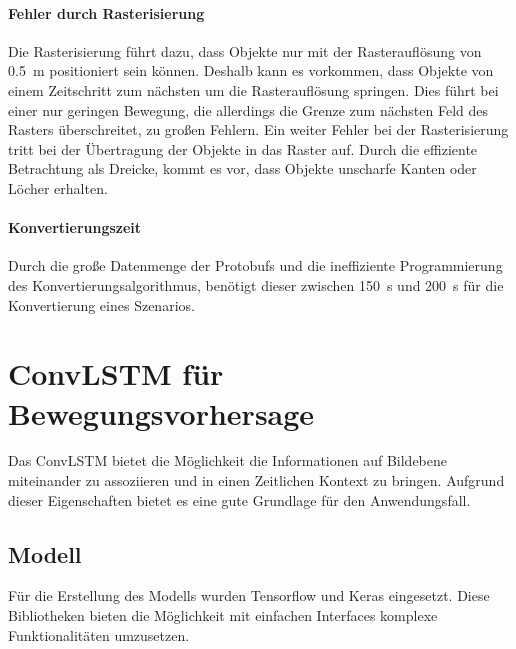 \documentclass[12pt]{article}
\begin{document}
        \paragraph{Fehler durch Rasterisierung} Die Rasterisierung führt dazu, dass Objekte nur mit der Rasterauflösung von 0.5~m positioniert sein können. 
        Deshalb kann es vorkommen, dass Objekte von einem Zeitschritt zum nächsten um die Rasterauflösung springen. 
        Dies führt bei einer nur geringen Bewegung, die allerdings die Grenze zum nächsten Feld des Rasters überschreitet, zu großen Fehlern. 
        Ein weiter Fehler bei der Rasterisierung tritt bei der Übertragung der Objekte in das Raster auf. Durch die effiziente Betrachtung als Dreicke, kommt es vor, 
        dass Objekte unscharfe Kanten oder Löcher erhalten.
        
        \paragraph{Konvertierungszeit} Durch die große Datenmenge der Protobufs und die ineffiziente Programmierung des Konvertierungsalgorithmus, 
        benötigt dieser zwischen 150~s und 200~s für die Konvertierung eines Szenarios.

\pagebreak
\section{ConvLSTM für Bewegungsvorhersage}
    Das ConvLSTM bietet die Möglichkeit die Informationen auf Bildebene miteinander zu assoziieren 
    und in einen Zeitlichen Kontext zu bringen. Aufgrund dieser Eigenschaften bietet es eine gute Grundlage für den Anwendungsfall.
    \subsection{Modell}
        Für die Erstellung des Modells wurden Tensorflow und Keras eingesetzt. 
        Diese Bibliotheken bieten die Möglichkeit mit einfachen Interfaces komplexe Funktionalitäten umzusetzen.
\end{document}
